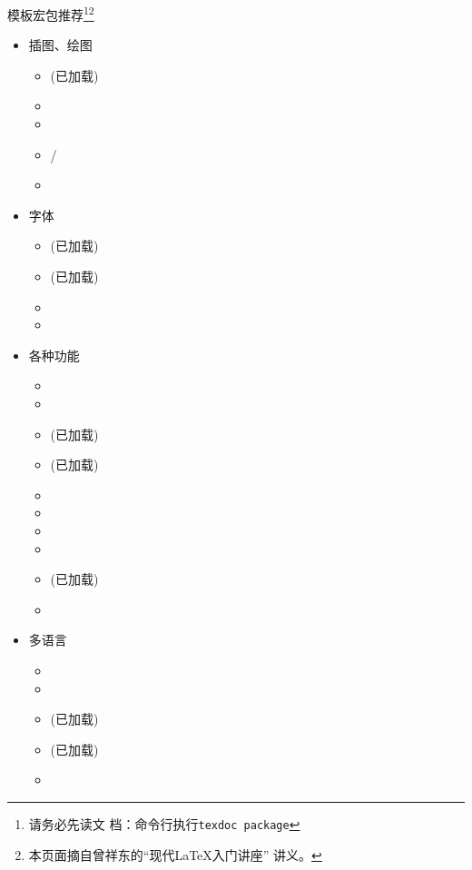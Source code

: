\documentclass[fontset = none, xcolor=svgnames, t, aspectratio=169]{ctexbeamer}
\begin{document}
\begin{frame}{\nwafuthesis 模板}{宏包推荐\footnote[frame,3]{请务必先读文
      档：命令行执行\alert{\texttt{texdoc package}}}\footnote[frame,4]{本页面摘自曾祥东的\enquote{现代\LaTeX 入门讲座}
      讲义。}}
\begin{multicols}{3}
\begin{itemize}
    \item 插图、绘图

      \begin{itemize}
      \item {}(已加载)
      \item {}
      \item {}
      \item {}/
      \item {}
      \end{itemize}

    \item 字体

      \begin{itemize}
      \item {}(已加载)
      \item {}(已加载)
      \item {}
      \item {}
      \end{itemize}

    \item 各种功能

      \begin{itemize}
      \item {}
      \item {}
      \item {}(已加载)
      \item {}(已加载)
      \item {}
      \item {}
      \item {}
      \item {}
      \item {}(已加载)
      \item {}
      \end{itemize}

    \item 多语言

      \begin{itemize}
      \item {}
      \item {}
      \item {}(已加载)
      \item {}(已加载)
      \item {}
      \end{itemize}
    \end{itemize}
  \end{multicols}
  \vspace*{-0.5cm}
  \stretchoff
\end{frame}
\end{document}
